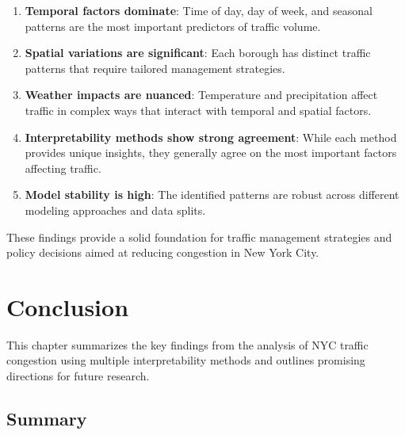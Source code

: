 \documentclass[
  letterpaper,
  DIV=11,
  numbers=noendperiod]{scrreprt}
\begin{document}
\begin{enumerate}
\def\labelenumi{\arabic{enumi}.}
\item
  \textbf{Temporal factors dominate}: Time of day, day of week, and
  seasonal patterns are the most important predictors of traffic volume.
\item
  \textbf{Spatial variations are significant}: Each borough has distinct
  traffic patterns that require tailored management strategies.
\item
  \textbf{Weather impacts are nuanced}: Temperature and precipitation
  affect traffic in complex ways that interact with temporal and spatial
  factors.
\item
  \textbf{Interpretability methods show strong agreement}: While each
  method provides unique insights, they generally agree on the most
  important factors affecting traffic.
\item
  \textbf{Model stability is high}: The identified patterns are robust
  across different modeling approaches and data splits.
\end{enumerate}

These findings provide a solid foundation for traffic management
strategies and policy decisions aimed at reducing congestion in New York
City.


\chapter{Conclusion}\label{conclusion}

This chapter summarizes the key findings from the analysis of NYC
traffic congestion using multiple interpretability methods and outlines
promising directions for future research.

\section{Summary}\label{summary-2}
\end{document}
